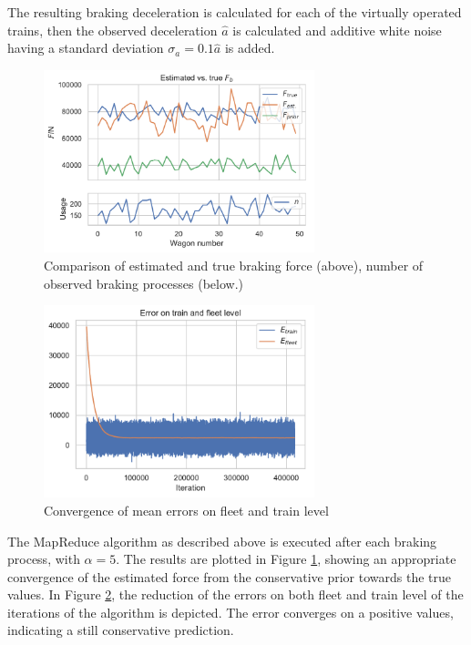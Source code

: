 \documentclass[a4paper, 12pt]{scrartcl}
\begin{document}
The resulting braking deceleration is calculated for each of the virtually operated trains, then the observed deceleration $\hat{a}$ is calculated and additive white noise having a standard deviation $\sigma_{a} = 0.1\hat{a}$ is added. 

\begin{figure}
\begin{center}
\includegraphics[width = 0.7\textwidth]{190121FleetEstimate}
\caption{Comparison of estimated and true braking force (above), number of observed braking processes (below.)}
\label{Fig:BrakingF}
\end{center}
\end{figure}

\begin{figure}
\begin{center}
\includegraphics[width = 0.7\textwidth]{190121Errors}
\caption{Convergence of mean errors on fleet and train level}
\label{Fig:BrakingError}
\end{center}
\end{figure}

The MapReduce algorithm as described above is executed after each braking process, with $\alpha = 5$. The results are plotted in Figure \ref{Fig:BrakingF}, showing an appropriate convergence of the estimated force from the conservative prior  towards the true values. In Figure \ref{Fig:BrakingError}, the reduction of the errors on both fleet and train level of the iterations of the algorithm is depicted. The error converges on a positive values, indicating a still conservative prediction.
\end{document}
